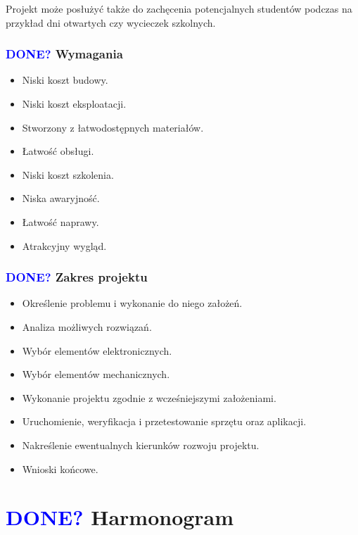 \documentclass[11pt,titlepage,a4paper]{article}
\begin{document}
Projekt może posłużyć także do zachęcenia potencjalnych studentów podczas na przykład dni otwartych czy wycieczek szkolnych.

\newpage

\subsubsection{\textcolor{blue}{DONE?} Wymagania}

\begin{itemize}
    \item Niski koszt budowy.
    \item Niski koszt eksploatacji.
    \item Stworzony z łatwodostępnych materiałów.
    \item Łatwość obsługi.
    \item Niski koszt szkolenia.
    \item Niska awaryjność.
    \item Łatwość naprawy.
    \item Atrakcyjny wygląd.
\end{itemize}

\vspace*{2.5cm}

\subsubsection{\textcolor{blue}{DONE?} Zakres projektu}

\begin{itemize}
    \item Określenie problemu i wykonanie do niego założeń.
    \item Analiza możliwych rozwiązań.
    \item Wybór elementów elektronicznych.
    \item Wybór elementów mechanicznych.
    \item Wykonanie projektu zgodnie z wcześniejszymi założeniami.
    \item Uruchomienie, weryfikacja i przetestowanie sprzętu oraz aplikacji.
    \item Nakreślenie ewentualnych kierunków rozwoju projektu.
    \item Wnioski końcowe.
\end{itemize}

\newpage

\section{\textcolor{blue}{DONE?} Harmonogram}
\end{document}

